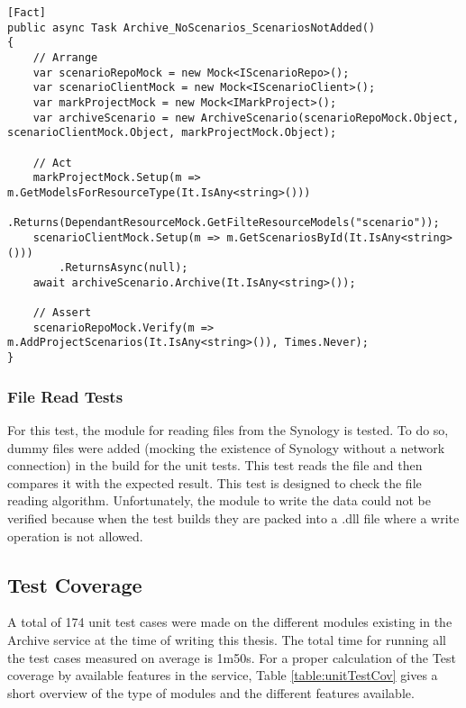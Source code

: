 \begin{lstlisting}[language={[Sharp]C}, caption={No scenarios added if resource empty}, captionpos=b,label={lst:scenarisEmpty}]
[Fact]
public async Task Archive_NoScenarios_ScenariosNotAdded()
{
    // Arrange
    var scenarioRepoMock = new Mock<IScenarioRepo>();
    var scenarioClientMock = new Mock<IScenarioClient>();
    var markProjectMock = new Mock<IMarkProject>();
    var archiveScenario = new ArchiveScenario(scenarioRepoMock.Object, scenarioClientMock.Object, markProjectMock.Object);
    
    // Act
    markProjectMock.Setup(m => m.GetModelsForResourceType(It.IsAny<string>()))
        .Returns(DependantResourceMock.GetFilteResourceModels("scenario"));
    scenarioClientMock.Setup(m => m.GetScenariosById(It.IsAny<string>()))
        .ReturnsAsync(null);
    await archiveScenario.Archive(It.IsAny<string>());                
    
    // Assert
    scenarioRepoMock.Verify(m => m.AddProjectScenarios(It.IsAny<string>()), Times.Never);
}
\end{lstlisting}

\subsubsection{File Read Tests}
For this test, the module for reading files from the Synology is tested. To do so, dummy files were added (mocking the existence of Synology without 
a network connection) in the build for the unit tests. This test reads the file
and then compares it with the expected result. This test is designed to check the file reading algorithm. Unfortunately, the module to write the data
could not be verified because when the test builds they are packed into a .dll file where a write operation is not allowed.

\subsection{Test Coverage}
A total of 174 unit test cases were made on the different modules existing in the Archive service at the time of writing this thesis. The total time for running all 
the test cases measured on average is 1m50s. For a proper calculation of the Test coverage by available features in the service, Table \ref{table:unitTestCov} gives a short
overview of the type of modules and the different features available.


